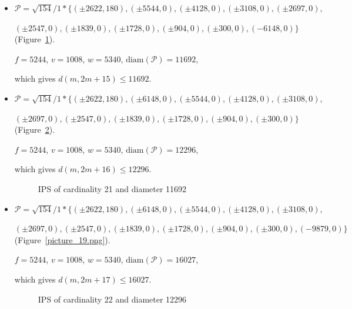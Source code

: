 \documentclass[12pt]{article}
\theoremstyle{theorem}
\theoremstyle{dfn}
\theoremstyle{remark}
\begin{document}
\begin{itemize}
\item
$\mathcal{P}=\sqrt{154}/{1} * \{ (\pm 2622, 180),
(\pm 5544 , 0),
(\pm 4128 , 0),
(\pm 3108 , 0),
(\pm 2697 , 0),
$

$
(\pm 2547 , 0),
(\pm 1839 , 0),
(\pm 1728 , 0),
(\pm 904 , 0),
(\pm 300 , 0),
(-6148 , 0)\}
$
(Figure~\ref{picture_17.png}).

$f = 5244$, $v = 1008$, $w = 5340$, $\operatorname{diam(\mathcal{P})} = 11692$,

which gives $d(m, 2m + 15) \leq 11692$.


\item
$\mathcal{P}=\sqrt{154}/{1} * \{ (\pm 2622, 180),
(\pm 6148 , 0),
(\pm 5544 , 0),
(\pm 4128 , 0),
(\pm 3108 , 0),
$

$
(\pm 2697 , 0),
(\pm 2547 , 0),
(\pm 1839 , 0),
(\pm 1728 , 0),
(\pm 904 , 0),
(\pm 300 , 0)\}
$
(Figure~\ref{picture_18.png}).

$f = 5244$, $v = 1008$, $w = 5340$, $\operatorname{diam(\mathcal{P})} = 12296$,

which gives $d(m, 2m + 16) \leq 12296$.


\begin{figure}[h!]
\parbox{0.75\linewidth}{\caption{IPS of cardinality 21 and diameter 11692}
\label{picture_17.png}}
\end{figure}


\item
$\mathcal{P}=\sqrt{154}/{1} * \{ (\pm 2622, 180),
(\pm 6148 , 0),
(\pm 5544 , 0),
(\pm 4128 , 0),
(\pm 3108 , 0),
$

$
(\pm 2697  , 0),
(\pm 2547 , 0),
(\pm 1839 , 0),
(\pm 1728 , 0),
(\pm 904 , 0),
(\pm 300 , 0),
(-9879 , 0)\}
$
(Figure~\ref{picture_19.png}).

$f = 5244$, $v = 1008$, $w = 5340$, $\operatorname{diam(\mathcal{P})} = 16027$,

which gives $d(m, 2m + 17) \leq 16027$.


\begin{figure}[h!]
\parbox{0.75\linewidth}{\caption{IPS of cardinality 22 and diameter 12296}
\label{picture_18.png}}
\end{figure}



\end{itemize}
\end{document}
